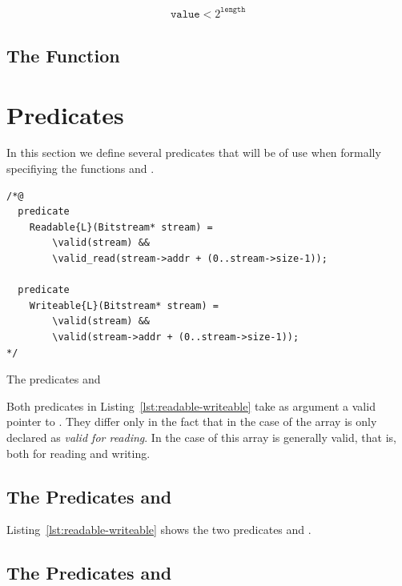\begin{align}
\label{eq:bit-stream-write-pre}
    \mathtt{value} < 2^{\mathtt{length}}
\end{align}

\subsection{The Function }


\section{Predicates}

In this section we define several \acsl predicates that will be of use when
formally specifiying the functions \bitstreamread and \bitstreamwrite.


\begin{listing}[hbt]
\begin{lstlisting}[style=acsl-block]
/*@
  predicate 
    Readable{L}(Bitstream* stream) =
        \valid(stream) &&
        \valid_read(stream->addr + (0..stream->size-1));

  predicate
    Writeable{L}(Bitstream* stream) =
        \valid(stream) &&
        \valid(stream->addr + (0..stream->size-1));
*/
\end{lstlisting}
\caption{\label{lst:readable-writeable} The predicates \readable and \writeable}
\end{listing}

Both predicates in Listing~\ref{lst:readable-writeable}
take as argument a valid pointer to \bitstream.
They differ only in the fact that in the case of \readable
the array  is only declared as \emph{valid for reading}.
In the case of \writeable this array is generally valid, that is, both for reading and writing.

\subsection{The Predicates \readable and \writeable}

Listing~\ref{lst:readable-writeable} shows the two predicates \readable and \writeable.

\subsection{The Predicates \invariant and \normal}
